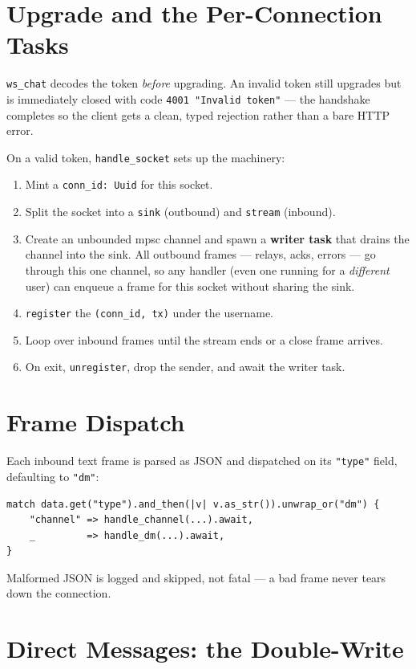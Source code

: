 \section{Upgrade and the Per-Connection Tasks}

\verb|ws_chat| decodes the token \emph{before} upgrading. An invalid token still
upgrades but is immediately closed with code \verb|4001 "Invalid token"| --- the
handshake completes so the client gets a clean, typed rejection rather than a
bare HTTP error.

On a valid token, \verb|handle_socket| sets up the machinery:

\begin{enumerate}
  \item Mint a \verb|conn_id: Uuid| for this socket.
  \item Split the socket into a \verb|sink| (outbound) and \verb|stream|
        (inbound).
  \item Create an unbounded mpsc channel and spawn a \textbf{writer task} that
        drains the channel into the sink. All outbound frames --- relays, acks,
        errors --- go through this one channel, so any handler (even one running
        for a \emph{different} user) can enqueue a frame for this socket without
        sharing the sink.
  \item \verb|register| the \verb|(conn_id, tx)| under the username.
  \item Loop over inbound frames until the stream ends or a close frame arrives.
  \item On exit, \verb|unregister|, drop the sender, and await the writer task.
\end{enumerate}

\section{Frame Dispatch}

Each inbound text frame is parsed as JSON and dispatched on its \verb|"type"|
field, defaulting to \verb|"dm"|:

\begin{lstlisting}
match data.get("type").and_then(|v| v.as_str()).unwrap_or("dm") {
    "channel" => handle_channel(...).await,
    _         => handle_dm(...).await,
}
\end{lstlisting}

Malformed JSON is logged and skipped, not fatal --- a bad frame never tears down
the connection.

\section{Direct Messages: the Double-Write}

